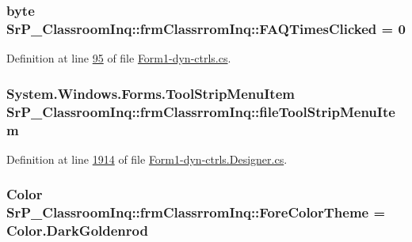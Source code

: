 \hypertarget{class_sr_p___classroom_inq_1_1frm_classrrom_inq_a81d1b27ebc720a6da339e1816eab4dfa}{
\subsubsection[{\-F\-A\-Q\-Times\-Clicked}]{\setlength{\rightskip}{0pt plus 5cm}byte {\bf \-Sr\-P\-\_\-\-Classroom\-Inq\-::frm\-Classrrom\-Inq\-::\-F\-A\-Q\-Times\-Clicked} = 0}}
\label{class_sr_p___classroom_inq_1_1frm_classrrom_inq_a81d1b27ebc720a6da339e1816eab4dfa}


\-Definition at line \hyperlink{_form1-dyn-ctrls_8cs_source_l00095}{95} of file \hyperlink{_form1-dyn-ctrls_8cs_source}{\-Form1-\/dyn-\/ctrls.\-cs}.

\hypertarget{class_sr_p___classroom_inq_1_1frm_classrrom_inq_a4aac2987ba1f61ee4bde4d91cdf35476}{
\subsubsection[{file\-Tool\-Strip\-Menu\-Item}]{\setlength{\rightskip}{0pt plus 5cm}\-System.\-Windows.\-Forms.\-Tool\-Strip\-Menu\-Item {\bf \-Sr\-P\-\_\-\-Classroom\-Inq\-::frm\-Classrrom\-Inq\-::file\-Tool\-Strip\-Menu\-Item}}}
\label{class_sr_p___classroom_inq_1_1frm_classrrom_inq_a4aac2987ba1f61ee4bde4d91cdf35476}


\-Definition at line \hyperlink{_form1-dyn-ctrls_8_designer_8cs_source_l01914}{1914} of file \hyperlink{_form1-dyn-ctrls_8_designer_8cs_source}{\-Form1-\/dyn-\/ctrls.\-Designer.\-cs}.

\hypertarget{class_sr_p___classroom_inq_1_1frm_classrrom_inq_ac239384db4489bc4b8b2a4cee9280849}{
\subsubsection[{\-Fore\-Color\-Theme}]{\setlength{\rightskip}{0pt plus 5cm}\-Color {\bf \-Sr\-P\-\_\-\-Classroom\-Inq\-::frm\-Classrrom\-Inq\-::\-Fore\-Color\-Theme} = \-Color.\-Dark\-Goldenrod}}
\label{class_sr_p___classroom_inq_1_1frm_classrrom_inq_ac239384db4489bc4b8b2a4cee9280849}


